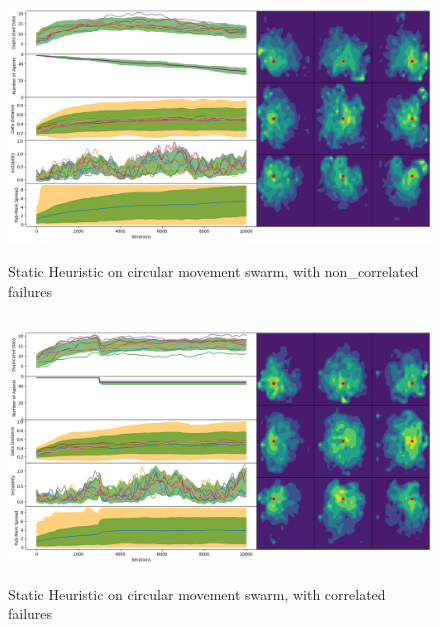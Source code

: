 \documentclass{UoYCSproject}
\begin{document}
\begin{figure}[htb]
\label{fig:circle_movement_non}
\begin{center}
\centering
\includegraphics[height=7cm]{"./Static_Heuristic/Circle_movement_non.png"}
\caption{Static Heuristic on circular movement swarm, with non\_correlated failures}
\end{center}
\end{figure}

\begin{figure}[htb]
\label{fig:circle_movement_con}
\begin{center}
\centering
\includegraphics[height=7cm]{"./Static_Heuristic/Circle_movement_concurrent.png"}
\caption{Static Heuristic on circular movement swarm, with correlated failures}
\end{center}
\end{figure}

\end{document}

